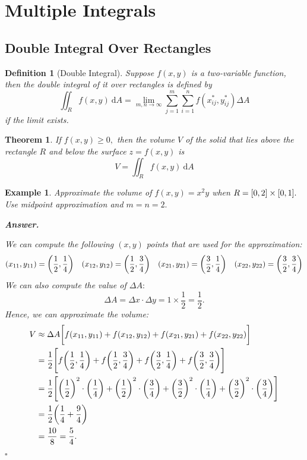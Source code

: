 \documentclass[12pt,a4paper]{article}
\newtheorem{thm}{Theorem}[subsection]
\newtheorem{df}{Definition}[subsection]
\newtheorem{eg}{Example}[subsection]
\newenvironment*{ans}{\par\indent\textbf{\textit{Answer. }}\par}{\par\hfill{$\square$}\par}
\def\dsst{\displaystyle}
\def\d{{\mathrm{d}}}
\def\iintR{\dsst\iint_R}
\begin{document}
\newpage
\section{Multiple Integrals}
\subsection{Double Integral Over Rectangles}
\begin{df}[Double Integral]
	Suppose $f(x,y)$ is a two-variable function, then the double integral of it over rectangles is defined by \[\iintR f(x,y)\ \d A=\lim_{m,n\to\infty}\sum_{j=1}^m\sum_{i=1}^n f(x_{ij}^*, y_{ij}^*)\Delta A\] if the limit exists. 	
\end{df}
\begin{thm}
	If $f(x,y)\geq0,$ then the volume $V$ of the solid that lies above the rectangle $R$ and below the surface $z=f(x,y)$ is \[V=\iintR f(x,y)\ \d A\]
\end{thm}
\begin{eg}
	Approximate the volume of $f(x,y)=x^2y$ when $R=\qty[0,2]\times\qty[0,1].$ Use midpoint approximation and $m=n=2.$	
	\begin{ans}
		We can compute the following $(x,y)$ points that are used for the approximation: \[(x_{11},y_{11})=\qty(\frac{1}{2}, \frac{1}{4})\quad(x_{12},y_{12})=\qty(\frac{1}{2}, \frac{3}{4})\quad(x_{21},y_{21})=\qty(\frac{3}{2}, \frac{1}{4})\quad(x_{22},y_{22})=\qty(\frac{3}{2}, \frac{3}{4})\] We can also compute the value of $\Delta A:$ \[\Delta A=\Delta x\cdot\Delta y=1\times\dfrac{1}{2}=\dfrac{1}{2}.\] Hence, we can approximate the volume: \[\begin{aligned}V&\approx\Delta A\qty\bigg[f(x_{11},y_{11})+f(x_{12},y_{12})+f(x_{21},y_{21})+f(x_{22},y_{22})]\\&=\dfrac{1}{2}\qty\Bigg[f\qty(\frac{1}{2}, \frac{1}{4})+f\qty(\frac{1}{2}, \frac{3}{4})+f\qty(\frac{3}{2}, \frac{1}{4})+f\qty(\frac{3}{2}, \frac{3}{4})]\\&=\dfrac{1}{2}\qty\Bigg[\qty(\dfrac{1}{2})^2\cdot\qty(\dfrac{1}{4})+\qty(\dfrac{1}{2})^2\cdot\qty(\dfrac{3}{4})+\qty(\dfrac{3}{2})^2\cdot\qty(\dfrac{1}{4})+\qty(\dfrac{3}{2})^2\cdot\qty(\dfrac{3}{4})]\\&=\dfrac{1}{2}\qty(\dfrac{1}{4}+\dfrac{9}{4})\\&=\dfrac{10}{8}=\dfrac{5}{4}.\end{aligned}\]
	\end{ans}
\end{eg}
\end{document}
